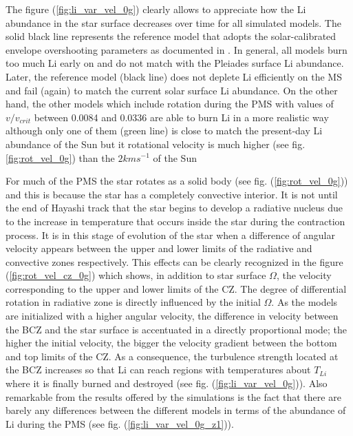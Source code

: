 \documentclass[fleqn,usenatbib]{mnras}
\begin{document}
The figure (\ref{fig:li_var_vel_0g}) clearly allows to appreciate how the Li abundance in the star surface decreases over time for all simulated models. The solid black line represents the reference model that adopts the solar-calibrated envelope overshooting parameters as documented in \citet{Choi2016}. In general, all models burn too much Li early on and do not match with the Pleiades surface Li abundance. Later, the reference model (black line) does not deplete Li efficiently on the MS and fail (again) to match the current solar surface Li abundance. On the other hand, the other models which include rotation during the PMS with values of $v/v_{crit}$ between 0.0084 and 0.0336 are able to burn Li in a more realistic way although only one of them (green line) is close to match the present-day Li abundance of the Sun but it rotational velocity is much higher (see fig. \ref{fig:rot_vel_0g}) than the $2 kms^{-1}$ of the Sun \citep{Gill2012} \par

For much of the PMS the star rotates as a solid body (see fig. (\ref{fig:rot_vel_0g})) and this is because the star has a completely convective interior. It is not until the end of Hayashi track that the star begins to develop a radiative nucleus due to the increase in temperature that occurs inside the star during the contraction process. It is in this stage of evolution of the star when a difference of angular velocity appears between the upper and lower limits of the radiative and convective zones respectively. This effects can be clearly recognized in the figure (\ref{fig:rot_vel_cz_0g}) which shows, in addition to star surface $\Omega$, the velocity corresponding to the upper and lower limits of the CZ. The degree of differential rotation in radiative zone is directly influenced by the initial $\Omega$. As the models are initialized with a higher angular velocity, the difference in velocity between the BCZ and the star surface is accentuated in a directly proportional mode; the higher the initial velocity, the bigger the velocity gradient between the bottom and top limits of the CZ. As a consequence, the turbulence strength located at the BCZ increases so that Li can reach regions with temperatures about $T_{Li}$ where it is finally burned and destroyed (see fig. (\ref{fig:li_var_vel_0g})). Also remarkable from the results offered by the simulations is the fact that there are barely any differences between the different models in terms of the abundance of Li during the PMS (see fig. (\ref{fig:li_var_vel_0g_z1})).\par
\end{document}
